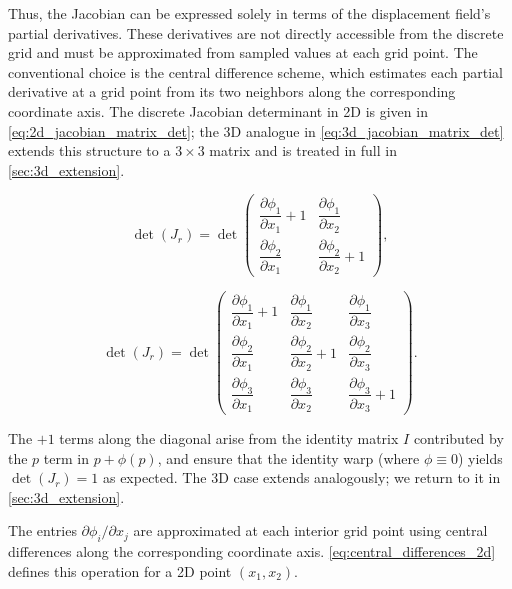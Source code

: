 \documentclass[lettersize,journal]{IEEEtran}
\begin{document}
Thus, the Jacobian can be expressed solely in terms of the displacement field's partial derivatives. These derivatives are not directly accessible from the discrete grid and must be approximated from sampled values at each grid point. The conventional choice is the central difference scheme, which estimates each partial derivative at a grid point from its two neighbors along the corresponding coordinate axis. The discrete Jacobian determinant in 2D is given in \autoref{eq:2d_jacobian_matrix_det}; the 3D analogue in \autoref{eq:3d_jacobian_matrix_det} extends this structure to a $3\times 3$ matrix and is treated in full in \autoref{sec:3d_extension}.

\begin{equation} \label{eq:2d_jacobian_matrix_det}
    \det(J_r) = 
\det\begin{pmatrix}
    \dfrac{\partial \phi_1}{\partial x_1} + 1 & \dfrac{\partial \phi_1}{\partial x_2} \\[6pt]
    \dfrac{\partial \phi_2}{\partial x_1} & \dfrac{\partial \phi_2}{\partial x_2} + 1
\end{pmatrix},
\end{equation}

\begin{equation} \label{eq:3d_jacobian_matrix_det}
    \det(J_r) = 
    \det\begin{pmatrix}
        \dfrac{\partial \phi_1}{\partial x_1} + 1 & \dfrac{\partial \phi_1}{\partial x_2} & \dfrac{\partial \phi_1}{\partial x_3} \\[6pt]
        \dfrac{\partial \phi_2}{\partial x_1} & \dfrac{\partial \phi_2}{\partial x_2} + 1 & \dfrac{\partial \phi_2}{\partial x_3} \\[6pt]
        \dfrac{\partial \phi_3}{\partial x_1} & \dfrac{\partial \phi_3}{\partial x_2} & \dfrac{\partial \phi_3}{\partial x_3} + 1
    \end{pmatrix}.
\end{equation}

The $+ 1$ terms along the diagonal arise from the identity matrix $I$ contributed by the $p$ term in $p + \phi(p)$, and ensure that the identity warp (where $\phi \equiv 0$) yields $\det(J_r) = 1$ as expected. The 3D case extends analogously; we return to it in \autoref{sec:3d_extension}.

The entries $\partial \phi_i / \partial x_j$ are approximated at each interior grid point using central differences along the corresponding coordinate axis. \autoref{eq:central_differences_2d} defines this operation for a 2D point $(x_1, x_2)$.
\end{document}
